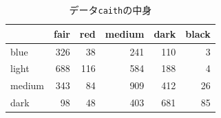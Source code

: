 \begin{table}[ht]
	\caption{データ\texttt{caith}の中身}
	\centering
	\begin{tabular}{lrrrrr}
		\hline
		       & fair & red & medium & dark & black \\\hline
		\hline
		blue   & 326  & 38  & 241    & 110  & 3     \\
		light  & 688  & 116 & 584    & 188  & 4     \\
		medium & 343  & 84  & 909    & 412  & 26    \\
		dark   & 98   & 48  & 403    & 681  & 85    \\
		\hline
	\end{tabular}
	\label{tbl::14_06}
\end{table}
